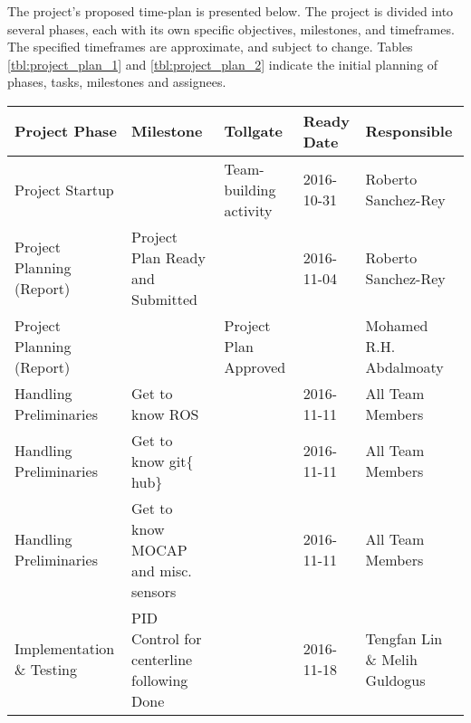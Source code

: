 \label{04}

The project's proposed time-plan is presented below. The
project is divided into several phases, each with its own specific objectives,
milestones, and timeframes. The specified timeframes are approximate, and
subject to change. Tables \ref{tbl:project_plan_1} and \ref{tbl:project_plan_2}
indicate the initial planning of phases, tasks, milestones and assignees.

\begin{landscape}
\begin{table}
    \begin{tabularx}{\linewidth}{l|X|XXX}
    Project Phase                   & Milestone                                           & Tollgate                                      & Ready Date & Responsible                                              \\ \hline
    Project Startup                 & ~                                                   & Team-building activity                        & 2016-10-31 & Roberto Sanchez-Rey                                      \\
    Project Planning (Report)       & Project Plan Ready and Submitted                    & ~                                             & 2016-11-04 & Roberto Sanchez-Rey                                      \\
    Project Planning (Report)       & ~                                                   & Project Plan Approved                         & ~          & Mohamed R.H. Abdalmoaty                                  \\ \hline
    Handling Preliminaries          & Get to know ROS                                     & ~                                             & 2016-11-11 & All Team Members                                         \\
    Handling Preliminaries          & Get to know git$\{$hub$\}$                          & ~                                             & 2016-11-11 & All Team Members                                         \\
    Handling Preliminaries          & Get to know MOCAP and misc. sensors                 & ~                                             & 2016-11-11 & All Team Members                                         \\ \hline
    Implementation \& Testing       & PID Control for centerline following Done           & ~                                             & 2016-11-18 & Tengfan Lin \& Melih Guldogus                            \\

\end{tabularx}
\end{table}
\end{landscape}
